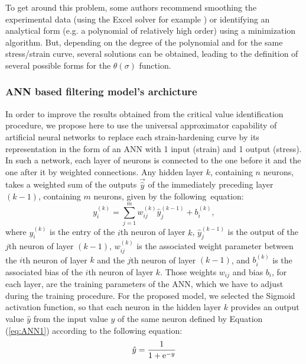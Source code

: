 \documentclass[metals,article,submit,pdftex,moreauthors]{Definitions/mdpi}
\DeclareRobustCommand{\e}[1]{{\rm e}^{#1}}
\DeclareRobustCommand{\lay}[1]{^{(#1)}}
\begin{document}
To get around this problem, some authors recommend smoothing the experimental data (using the Excel solver for example \cite{Najafizadeh-2006}) or identifying an analytical form (e.g. a polynomial of relatively high order) using a minimization algorithm.
But, depending on the degree of the polynomial and for the same stress/strain curve, several solutions can be obtained, leading to the definition of several possible forms for the $\theta(\sigma)$ function.

\subsubsection{ANN based filtering model's archicture \label{subsec:ANNbasics}}
In order to improve the results obtained from the critical value identification procedure, we propose here to use the universal approximator capability of artificial neural networks to replace each strain-hardening curve by its representation in the form of an ANN with 1 input (strain) and 1 output (stress).
In such a network, each layer of neurons is connected to the one before it and the one after it by weighted connections.
Any hidden layer $k$, containing $n$ neurons, takes a weighted sum of the outputs $\overrightarrow{\hat{y}}$ of the immediately preceding layer $(k-1)$, containing $m$ neurons, given by the following~equation:
\begin{equation}
y_i\lay{k} = \sum_{j=1}^m w_{ij}\lay{k} \hat{y}_j^{(k-1)}+ b_i\lay{k},\label{eq:ANN1}
\end{equation}
where $y_i\lay{k}$ is the entry of the $i$th neuron of layer $k$, $\hat{y}_j\lay{k-1}$ is the output of the $j$th neuron of layer $(k-1)$, $w_{ij}\lay{k}$ is the associated weight parameter between the $i$th neuron of layer $k$ and the $j$th neuron of layer $(k-1)$, and $b_i\lay{k}$ is the associated bias of the $i$th neuron of layer $k$.
Those weights $w_{ij}$ and bias $b_i$, for each layer, are the training parameters of the ANN, which we have to adjust during the training procedure.
For the proposed model, we selected the Sigmoid activation function, so that each neuron in the hidden layer $k$ provides an output value ${\hat{y}}$ from the input value $y$ of the same neuron defined by Equation (\ref{eq:ANN1}) according to the following equation:
\begin{equation}
\hat{y}=\frac{1}{1 + \e{-y}}\label{eq:ANN2}
\end{equation}
\end{document}
